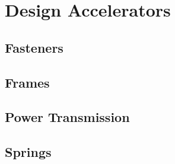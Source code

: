 \chapter{Design Accelerators}

\section{Fasteners}

\section{Frames}

\section{Power Transmission}

\section{Springs}